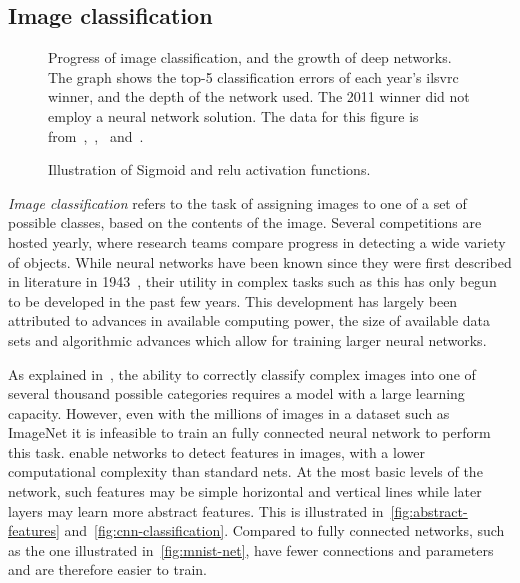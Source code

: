 \documentclass[\rootfolder/main.tex]{subfiles}
\begin{document}
\subsection{Image classification}

\begin{figure}
    \caption[The influence of deep learning on image classification error rates.]%
            {Progress of image classification, and the growth of deep networks. %
            The graph shows the top-5 classification errors of each year's \acrshort{ilsvrc} winner, and the depth of the network used. %
            The 2011 winner did not employ a neural network solution.
            The data for this figure is from~\cite{Krizhevsky2012},~\cite{Zeiler2013},~\cite{Szegedy2014} and~\cite{He2016}.}
    \label{fig:ilsvrc}
\end{figure}

\begin{wrapfigure}{R}{0.5\columnwidth}
    \caption{Illustration of Sigmoid and \acrshort{relu} activation functions.}
    \label{fig:activation-functions}
\end{wrapfigure}

\emph{Image classification} refers to the task of assigning images to one of a set of possible classes, based on the contents of the image.
Several competitions are hosted yearly, where research teams compare progress in detecting a wide variety of objects.
While neural networks have been known since they were first described in literature in 1943~\cite{Mitchell1997}\cite{Mcculloch1943}, their utility in complex tasks such as this has only begun to be developed in the past few years.
This development has largely been attributed to advances in available computing power, the size of available data sets and algorithmic advances which allow for training larger neural networks.

As explained in~\cite{Krizhevsky2012}, the ability to correctly classify complex images into one of several thousand possible categories requires a model with a large learning capacity.
However, even with the millions of images in a dataset such as ImageNet it is infeasible to train an fully connected neural network to perform this task.
 enable networks to detect features in images, with a lower computational complexity than standard nets.
At the most basic levels of the network, such features may be simple horizontal and vertical lines while later layers may learn more abstract features.
This is illustrated in~\cref{fig:abstract-features} and~\cref{fig:cnn-classification}.
Compared to fully connected networks, such as the one illustrated in~\cref{fig:mnist-net},  have fewer connections and parameters and are therefore easier to train.
\end{document}
